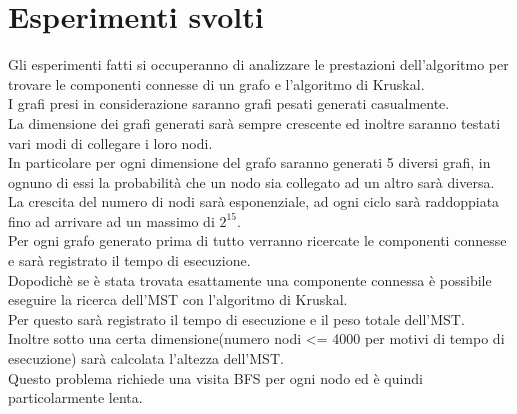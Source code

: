 \documentclass[]{article}
\begin{document}
\section{Esperimenti svolti}
Gli esperimenti fatti si occuperanno di analizzare le prestazioni dell'algoritmo per trovare le componenti connesse di un grafo e l'algoritmo di Kruskal.\\
I grafi presi in considerazione saranno grafi pesati generati casualmente.\\
La dimensione dei grafi generati sarà sempre crescente ed inoltre saranno testati vari modi di collegare i loro nodi.\\
In particolare per ogni dimensione del grafo saranno generati 5 diversi grafi, in ognuno di essi la probabilità che un nodo sia collegato ad un altro sarà diversa.\\
La crescita del numero di nodi sarà esponenziale, ad ogni ciclo sarà raddoppiata fino ad arrivare ad un massimo di $2^{15}$.\\
Per ogni grafo generato prima di tutto verranno ricercate le componenti connesse e sarà registrato il tempo di esecuzione.\\
Dopodichè se è stata trovata esattamente una componente connessa è possibile eseguire la ricerca dell'MST con l'algoritmo di Kruskal.\\
Per questo sarà registrato il tempo di esecuzione e il peso totale dell'MST.\\
Inoltre sotto una certa dimensione(numero nodi <= 4000 per motivi di tempo di esecuzione) sarà calcolata l'altezza dell'MST.\\
Questo problema richiede una visita BFS per ogni nodo ed è quindi particolarmente lenta.\\
\end{document}
